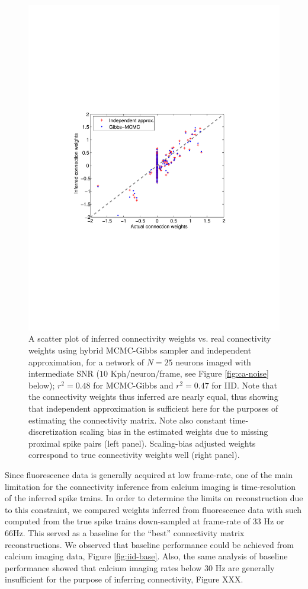 \begin{figure}
\begin{minipage}[c]{0.45\hsize}
\includegraphics[width=\hsize]{../figs/Figure1b_fluor_mcmc_vs_iid}
\end{minipage}
\caption{A scatter plot of inferred connectivity weights vs. real connectivity weights
using hybrid MCMC-Gibbs sampler and independent approximation, for a network of $N=25$ neurons imaged
with intermediate SNR ($10$ Kph/neuron/frame, see Figure \ref{fig:ca-noise} below); $r^2=0.48$ for MCMC-Gibbs and
$r^2=0.47$ for IID. Note that the connectivity weights thus inferred are nearly equal, thus showing that independent approximation is sufficient here for the purposes of estimating the connectivity matrix. Note also constant time-discretization scaling bias in the estimated weights due to missing proximal spike pairs (left panel). 
Scaling-bias adjusted weights correspond to true connectivity weights well (right panel).}
\label{fig:mcmc-iid}
\end{figure}

Since fluorescence data is generally acquired at low frame-rate, one of the main limitation for the connectivity inference from calcium imaging is time-resolution of the inferred spike trains. In order to determine the limits on reconstruction due to this constraint, we compared weights inferred from fluorescence data with such computed from the true spike trains down-sampled at frame-rate of 33 Hz or 66Hz. This served as a baseline for the ``best'' connectivity matrix reconstructions. We observed that baseline performance could be achieved from calcium imaging data, Figure \ref{fig:iid-base}.  Also, the same analysis of baseline performance showed that calcium imaging rates below 30 Hz are generally insufficient for the purpose of inferring connectivity, Figure XXX.

